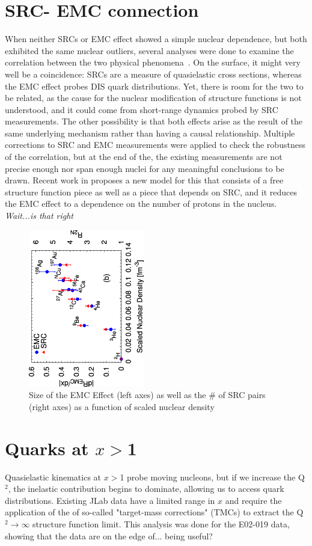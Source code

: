 \section{\label{sec:SRC_EMC}SRC- EMC connection}
When neither SRCs or EMC effect showed a simple nuclear dependence, but both exhibited the same nuclear outliers, several analyses were done to examine the correlation between the two physical phenomena~\cite{PhysRevC.86.065204, Hen:2012fm, Weinstein:2010rt}.  On the surface, it might very well be a coincidence: SRCs are a measure of quasielastic cross sections, whereas the EMC effect probes DIS quark distributions.  Yet, there is room for the two to be related, as the cause for the nuclear modification of structure functions is not understood, and it could come from short-range dynamics probed by SRC measurements.   The other possibility is that both effects arise as the result of the same underlying mechanism rather than having a causal relationship.  Multiple corrections to SRC and EMC measurements were applied to check the robustness of the correlation, but at the end of the, the existing measurements are not precise enough nor span enough nuclei for any meaningful conclusions to be drawn.  Recent work in %
proposes a new model for this that consists of a free structure function piece as well as a piece that depends on SRC, and it  reduces the EMC effect to a dependence on the number of protons in the nucleus.  \textit{Wait...is that right}
\begin{figure}[htb]
  \includegraphics[angle=270, width=0.45\textwidth]{plots/emc_src_vs_scaled_dens_all.eps}
  \caption{Size of the EMC Effect (left axes) as well as the \# of SRC pairs (right axes) as a function of scaled nuclear density}
  \label{fig:src_emc}
\end{figure}
\section{Quarks at $x>$1}
Quasielastic kinematics at $x>$1 probe moving nucleons, but if we increase the Q$^2$, the inelastic contribution begins to dominate, allowing us to access quark distributions. Existing JLab data have a limited range in $x$ and require the application of the of so-called "target-mass corrections" (TMCs) to extract the Q$^2\rightarrow\infty$ structure function limit.  This analysis was done for the E02-019 data, showing that the data are on the edge of... being useful?


